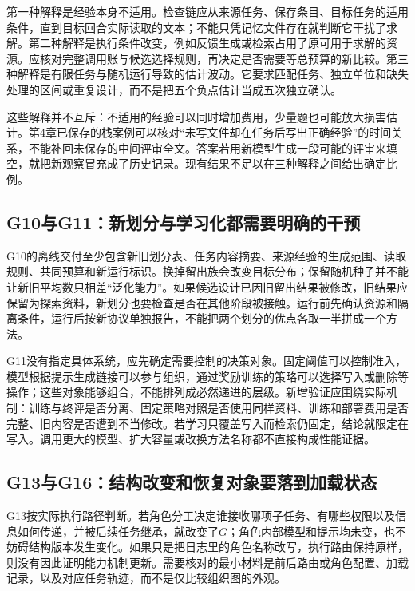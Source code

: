 第一种解释是经验本身不适用。检查链应从来源任务、保存条目、目标任务的适用条件，直到目标回合实际读取的文本；不能只凭记忆文件存在就判断它干扰了求解。第二种解释是执行条件改变，例如反馈生成或检索占用了原可用于求解的资源。应核对完整调用账与候选选择规则，再决定是否需要等总预算的新比较。第三种解释是有限任务与随机运行导致的估计波动。它要求匹配任务、独立单位和缺失处理的区间或重复设计，而不是把五个负点估计当成五次独立确认。

这些解释并不互斥：不适用的经验可以同时增加费用，少量题也可能放大损害估计。第4章已保存的栈案例可以核对“未写文件却在任务后写出正确经验”的时间关系，不能补回未保存的中间评审全文。答案若用新模型生成一段可能的评审来填空，就把新观察冒充成了历史记录。现有结果不足以在三种解释之间给出确定比例。

\subsection{G10与G11：新划分与学习化都需要明确的干预}\label{sol:g10}

G10的离线交付至少包含新旧划分表、任务内容摘要、来源经验的生成范围、读取规则、共同预算和新运行标识。换掉留出族会改变目标分布；保留随机种子并不能让新旧平均数只相差“泛化能力”。如果候选设计已因旧留出结果被修改，旧结果应保留为探索资料，新划分也要检查是否在其他阶段被接触。运行前先确认资源和隔离条件，运行后按新协议单独报告，不能把两个划分的优点各取一半拼成一个方法。

\leavevmode{}\label{sol:g11}G11没有指定具体系统，应先确定需要控制的决策对象。固定阈值可以控制准入，模型根据提示生成链接可以参与组织，通过奖励训练的策略可以选择写入或删除等操作；这些对象能够组合，不能排列成必然递进的层级。新增验证应围绕实际机制：训练与终评是否分离、固定策略对照是否使用同样资料、训练和部署费用是否完整、旧内容是否遭到不当修改。若学习只覆盖写入而检索仍固定，结论就限定在写入。调用更大的模型、扩大容量或改换方法名称都不直接构成性能证据。

\subsection{G13与G16：结构改变和恢复对象要落到加载状态}\label{sol:g13}

G13按实际执行路径判断。若角色分工决定谁接收哪项子任务、有哪些权限以及信息如何传递，并被后续任务继承，就改变了$G$；角色内部模型和提示均未变，也不妨碍结构版本发生变化。如果只是把日志里的角色名称改写，执行路由保持原样，则没有因此证明能力机制更新。需要核对的最小材料是前后路由或角色配置、加载记录，以及对应任务轨迹，而不是仅比较组织图的外观。

